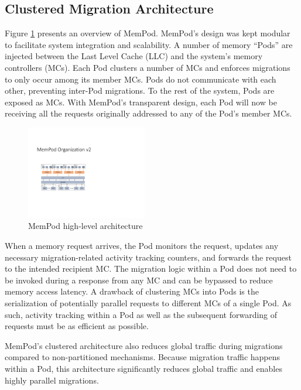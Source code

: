 \subsection{Clustered Migration Architecture}

 Figure \ref{fig:architecture_complete} presents an overview of MemPod. MemPod's design was kept modular to facilitate system integration and scalability. A number of memory ``Pods'' are injected between the Last Level Cache (LLC) and the system's memory controllers (MCs). Each Pod clusters a number of MCs and enforces migrations to only occur among its member MCs. Pods do not communicate with each other, preventing inter-Pod migrations. To the rest of the system, Pods are exposed as MCs. With MemPod's transparent design, each Pod will now be receiving all the requests originally addressed to any of the Pod's member MCs. 
 
\begin{figure}[h]
 \includegraphics[width=0.47\textwidth]{figures/mempod_org.pdf}
 \caption{MemPod high-level architecture}
 \label{fig:architecture_complete}
\end{figure}

When a memory request arrives, the Pod monitors the request, updates any 
necessary migration-related activity tracking counters, and forwards 
the request to the intended recipient MC. The migration logic within a Pod does not need to be invoked during a response from any MC and can be bypassed to reduce memory access latency. A drawback of clustering MCs into Pods is the serialization of potentially parallel requests to different MCs of a single Pod. As such, activity tracking within a Pod as well as the subsequent forwarding of requests must be as efficient as possible. 

MemPod's clustered architecture also reduces global traffic during migrations compared to non-partitioned mechanisms. Because migration
traffic happens within a Pod, this architecture significantly reduces global traffic and enables highly parallel migrations.


